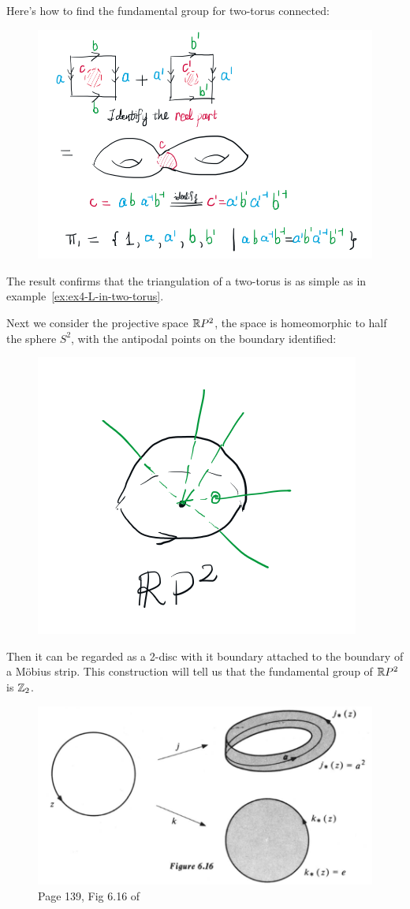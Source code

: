 \begin{ex}
    \label{ex:pi1-two-torus}
    Here's how to find the fundamental group for two-torus connected:
\begin{figure}[H]
    \centering
    \includegraphics[width=0.9\linewidth]{pics/ch6-notes-3/ex-pi1-two-torus.png}
\end{figure}
    The result confirms that the triangulation of a two-torus is as
    simple as in example~\ref{ex:ex4-L-in-two-torus}.
\end{ex}

\begin{ex}
    Next we consider the projective space $\mathbb{R} P^2$, the space is
    homeomorphic to half the sphere $S^2$, with the antipodal points
    on the boundary identified:
    \begin{figure}[H]
        \centering
        \includegraphics[width=0.4\linewidth]{pics/ch6-notes-3/rp2.png}
    \end{figure}
    Then it can be regarded as a 2-disc with it boundary attached to
    the boundary of a M\"obius strip. This construction will tell us
    that the fundamental group of $\mathbb{R} P^2$ is $\mathbb{Z}_2$.
    \begin{figure}[H]
        \centering
        \includegraphics[width=0.8\linewidth]{pics/ch6-notes-3/rp2-pi1.png}
        \caption{Page 139, Fig 6.16 of \cite{book}}
    \end{figure}
\end{ex}

